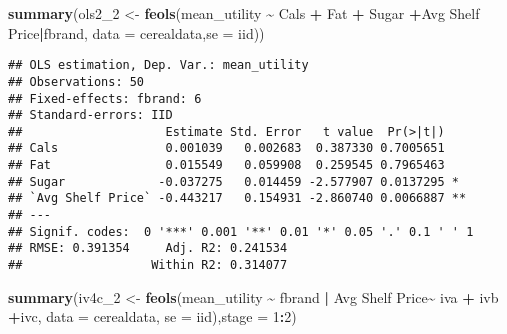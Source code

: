 \documentclass[
]{article}
\newenvironment{Shaded}{\begin{snugshade}}{\end{snugshade}}
\newcommand{\AttributeTok}[1]{\textcolor[rgb]{0.13,0.29,0.53}{#1}}
\newcommand{\DecValTok}[1]{\textcolor[rgb]{0.00,0.00,0.81}{#1}}
\newcommand{\FunctionTok}[1]{\textcolor[rgb]{0.13,0.29,0.53}{\textbf{#1}}}
\newcommand{\NormalTok}[1]{#1}
\newcommand{\OtherTok}[1]{\textcolor[rgb]{0.56,0.35,0.01}{#1}}
\newcommand{\SpecialCharTok}[1]{\textcolor[rgb]{0.81,0.36,0.00}{\textbf{#1}}}
\newcommand{\StringTok}[1]{\textcolor[rgb]{0.31,0.60,0.02}{#1}}
\begin{document}
\begin{Shaded}
\begin{Highlighting}[]
\FunctionTok{summary}\NormalTok{(ols2\_2 }\OtherTok{\textless{}{-}} \FunctionTok{feols}\NormalTok{(mean\_utility }\SpecialCharTok{\textasciitilde{}}\NormalTok{ Cals }\SpecialCharTok{+}\NormalTok{ Fat }\SpecialCharTok{+}\NormalTok{ Sugar }\SpecialCharTok{+}\StringTok{\textasciigrave{}}\AttributeTok{Avg Shelf Price}\StringTok{\textasciigrave{}}\SpecialCharTok{|}\NormalTok{fbrand, }
                        \AttributeTok{data =}\NormalTok{ cerealdata,}\AttributeTok{se =} \StringTok{\textquotesingle{}iid\textquotesingle{}}\NormalTok{))}
\end{Highlighting}
\end{Shaded}

\begin{verbatim}
## OLS estimation, Dep. Var.: mean_utility
## Observations: 50
## Fixed-effects: fbrand: 6
## Standard-errors: IID 
##                    Estimate Std. Error   t value  Pr(>|t|)    
## Cals               0.001039   0.002683  0.387330 0.7005651    
## Fat                0.015549   0.059908  0.259545 0.7965463    
## Sugar             -0.037275   0.014459 -2.577907 0.0137295 *  
## `Avg Shelf Price` -0.443217   0.154931 -2.860740 0.0066887 ** 
## ---
## Signif. codes:  0 '***' 0.001 '**' 0.01 '*' 0.05 '.' 0.1 ' ' 1
## RMSE: 0.391354     Adj. R2: 0.241534
##                  Within R2: 0.314077
\end{verbatim}

\begin{Shaded}
\begin{Highlighting}[]
\FunctionTok{summary}\NormalTok{(iv4c\_2 }\OtherTok{\textless{}{-}} \FunctionTok{feols}\NormalTok{(mean\_utility }\SpecialCharTok{\textasciitilde{}}\NormalTok{ fbrand }\SpecialCharTok{|}  \StringTok{\textasciigrave{}}\AttributeTok{Avg Shelf Price}\StringTok{\textasciigrave{}}\SpecialCharTok{\textasciitilde{}}\NormalTok{ iva }\SpecialCharTok{+}\NormalTok{ ivb }\SpecialCharTok{+}\NormalTok{ivc, }
                        \AttributeTok{data =}\NormalTok{ cerealdata, }\AttributeTok{se =} \StringTok{\textquotesingle{}iid\textquotesingle{}}\NormalTok{),}\AttributeTok{stage =} \DecValTok{1}\SpecialCharTok{:}\DecValTok{2}\NormalTok{)}
\end{Highlighting}
\end{Shaded}
\end{document}
